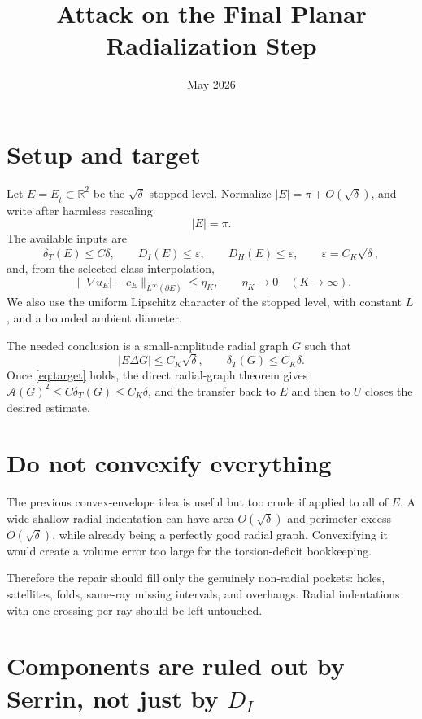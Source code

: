 \documentclass[11pt]{article}
\title{Attack on the Final Planar Radialization Step}
\author{}
\date{May 2026}
\newcommand{\R}{\mathbb R}
\newcommand{\Et}{E_{\hat t}}
\newcommand{\dT}{\delta_T}
\newcommand{\DI}{D_I}
\newcommand{\DHo}{D_H}
\newcommand{\A}{\mathcal A}
\begin{document}
\maketitle

\section{Setup and target}

Let \(E=\Et\subset\R^2\) be the \(\sqrt\delta\)-stopped level.  Normalize
\(|E|=\pi+O(\sqrt\delta)\), and write after harmless rescaling
\[
   |E|=\pi.
\]
The available inputs are
\[
   \dT(E)\le C\delta,
   \qquad
   \DI(E)\le \varepsilon,
   \qquad
   \DHo(E)\le \varepsilon,
   \qquad
   \varepsilon=C_K\sqrt\delta,
   \tag{1.1}\label{eq:inputs}
\]
and, from the selected-class interpolation,
\[
   \bigl\||\nabla u_E|-c_E\bigr\|_{L^\infty(\partial E)}
      \le \eta_K,
   \qquad
   \eta_K\to0 \quad(K\to\infty).
   \tag{1.2}\label{eq:serrin}
\]
We also use the uniform Lipschitz character of the stopped level, with
constant \(L\), and a bounded ambient diameter.

The needed conclusion is a small-amplitude radial graph \(G\) such that
\[
   |E\Delta G|\le C_K\sqrt\delta,
   \qquad
   \dT(G)\le C_K\delta .
   \tag{1.3}\label{eq:target}
\]
Once \eqref{eq:target} holds, the direct radial-graph theorem gives
\(\A(G)^2\le C\dT(G)\le C_K\delta\), and the transfer back to \(E\) and then
to \(U\) closes the desired estimate.

\section{Do not convexify everything}

The previous convex-envelope idea is useful but too crude if applied to all
of \(E\).  A wide shallow radial indentation can have area \(O(\sqrt\delta)\)
and perimeter excess \(O(\sqrt\delta)\), while already being a perfectly good
radial graph.  Convexifying it would create a volume error too large for the
torsion-deficit bookkeeping.

Therefore the repair should fill only the genuinely non-radial pockets:
holes, satellites, folds, same-ray missing intervals, and overhangs.  Radial
indentations with one crossing per ray should be left untouched.

\section{Components are ruled out by Serrin, not just by \(D_I\)}
\end{document}
